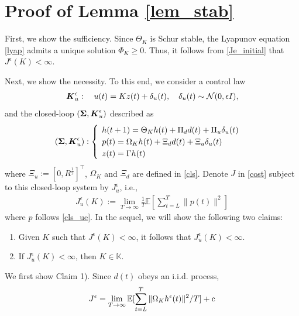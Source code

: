 \documentclass[preprint,5p,times,twocolumn]{elsarticle}
\newcommand{\bm}[1]{{\mbox{\boldmath $#1$}}}
\begin{document}
\section{Proof of Lemma \ref{lem_stab}}\label{prf_lem_stab}
First, we show the sufficiency. Since $\Theta_K$ is Schur stable, the Lyapunov equation \eqref{lyap} admits a unique solution $\Phi_K \geq 0$. Thus, it follows from \eqref{Je_initial} that $J^{\epsilon}(K) < \infty$.

Next, we show the necessity. To this end, we consider a control law 
\begin{align}
    {\bm K}^{\epsilon}_{u}: \quad  u(t) = Kz(t) + \delta_u(t), \quad \delta_u(t) \sim \mathcal N(0,\epsilon I), 
\end{align}
and the closed-loop $({\bm \Sigma}, {\bm K}^{\epsilon}_{u})$ described as 
\begin{align}\label{cls_ue}
\hspace{-4mm} ({\bm \Sigma}, {\bm K}_u^{\epsilon}): 
    \begin{cases}\hspace{-1pt}
    \hspace{-2mm}&h(t+1) = \Theta_K h(t) + \Pi_d d(t) + \Pi_u \delta_u (t)\\
    \hspace{-2mm}&p(t) = \Omega_K h(t) + \Xi_d d(t) + \Xi_u \delta_u(t)\\
    \hspace{-2mm}&z(t) = \Gamma h(t)
\end{cases}
\end{align}
where $\Xi_u := [0, R^{\frac{1}{2}}]^{\top}$, $\Omega_K$ and $\Xi_d$ are defined in \eqref{cls}. Denote $J$ in \eqref{cost} subject to this closed-loop system by $J_u^{\epsilon}$, i.e., 
\begin{align}\label{Jue}
    J_u^{\epsilon}(K) := \lim_{T\to\infty} \frac{1}{T}\mathbb E\left[\sum_{t=L}^{T}\|p(t)\|^2\right] 
\end{align}
where $p$ follows \eqref{cls_ue}. In the sequel, we will show the following two claims: 
\begin{enumerate}
    \item Given $K$ such that $J^{\epsilon}(K) < \infty$, it follows that $J_u^{\epsilon}(K) < \infty$. 
    \item If $J_u^{\epsilon}(K) < \infty$, then $K \in \mathbb K$.
\end{enumerate}
We first show Claim 1). Since $d(t)$ obeys an i.i.d. process, 
\begin{align}
    J^{\epsilon} = \lim_{T\to\infty}\mathbb E[\sum_{t=L}^{T}\|\Omega_Kh^{\epsilon}(t)\|^2/T] + {\rm c} \label{opm}
\end{align}
\end{document}
